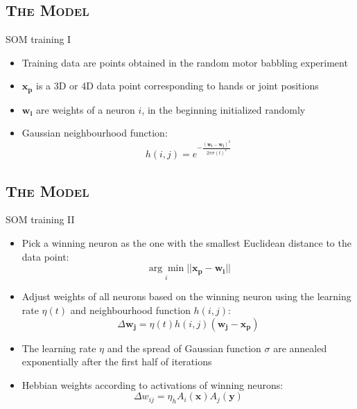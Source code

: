 \documentclass[xcolor=x11names,dvipsnames,compress]{beamer}
\renewcommand{\(}{\begin{columns}}
\renewcommand{\)}{\end{columns}}
\newcommand{\<}[1]{\begin{column}{#1}}
\renewcommand{\>}{\end{column}}
\begin{document}

\subsection{\scshape The Model}
\begin{frame}{SOM training I}
\begin{itemize}
 \item Training data are points obtained in the random motor babbling experiment
 \item $\mathbf{x_p}$ is a 3D or 4D data point corresponding to hands or joint positions 
 \item $\mathbf{w_i}$ are weights of a neuron $i$, in the beginning initialized randomly 
 \item Gaussian neighbourhood function:
\begin{equation}
h(i, j)=e^{-\frac{\left(\mathbf{w_i}-\mathbf{w_j}\right)^2}{2\pi\sigma(t)^2}}
\end{equation}
\end{itemize}
\end{frame}


\subsection{\scshape The Model}
\begin{frame}{SOM training II}
\begin{itemize}

\item Pick a winning neuron as the one with the smallest Euclidean distance to the data point: 
  \begin{equation}
    \underset{i}{\arg\min} || \mathbf{x_p}-\mathbf{w_i} ||
  \end{equation}

\item Adjust weights of all neurons based on the winning neuron using the learning rate $\eta(t)$ and neighbourhood function $h(i,j)$:
  \begin{equation}
    \Delta \mathbf{w_{j}} = \eta(t) h(i, j) (\mathbf{w_{j}}-\mathbf{x_p})
  \end{equation}

  \item The learning rate $\eta$ and the spread of Gaussian function $\sigma$ are annealed exponentially after the first half of iterations

  \item Hebbian weights according to activations of winning neurons:
  \begin{equation}
    \Delta w_{ij} = \eta_h A_i(\mathbf{x}) A_j(\mathbf{y})
  \end{equation}

\end{itemize}
\end{frame}
\end{document}
